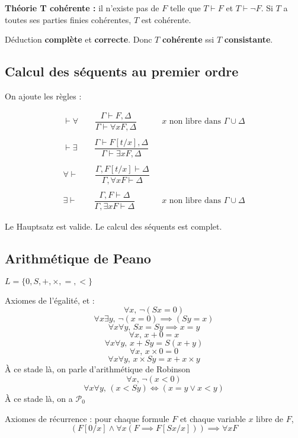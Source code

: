 \documentclass[french]{article}
\begin{document}
\textbf{Théorie T cohérente : }il n'existe pas de $F$ telle que $T\vdash F$ et $T\vdash\neg F$. Si $T$ a toutes ses parties finies cohérentes, $T$ est cohérente.

Déduction \textbf{complète} et \textbf{correcte}. Donc $T$ \textbf{cohérente} ssi $T$ \textbf{consistante}.

\subsection{Calcul des séquents au premier ordre}
On ajoute les règles :

\begin{align*}
\vdash\forall\qquad\dfrac{\Gamma\vdash F,\Delta}{\Gamma\vdash\forall x F,\Delta}&\text{ $x$ non libre dans $\Gamma\cup\Delta$}\\
\\
\vdash\exists\qquad\dfrac{\Gamma\vdash F[t/x],\Delta}{\Gamma\vdash\exists x F,\Delta}\\
\\
\forall\vdash\qquad\dfrac{\Gamma, F[t/x]\vdash\Delta}{\Gamma, \forall x F\vdash\Delta}\\
\\
\exists\vdash\qquad\dfrac{\Gamma, F\vdash\Delta}{\Gamma, \exists x F\vdash\Delta}&\text{ $x$ non libre dans  $\Gamma\cup\Delta$}
\end{align*}

Le Hauptsatz est valide. Le calcul des séquents est complet.

\subsection{Arithmétique de Peano}
$L = \{0,S,+,\times,=,<\}$

Axiomes de l'égalité, et :
$$\forall x,\, \neg(S x = 0)$$
$$\forall x\exists y,\, \neg(x=0)\implies(S y = x)$$
$$\forall x\forall y,\, S x = S y \implies x = y$$
$$\forall x,\, x+0=x$$
$$\forall x\forall y,\, x+S y = S(x + y)$$
$$\forall x,\, x\times 0 = 0$$
$$\forall x\forall y,\, x\times S y = x + x\times y$$
À ce stade là, on parle d'arithmétique de Robinson
$$\forall x,\, \neg(x<0)$$
$$\forall x\forall y,\, (x<S y)\Leftrightarrow(x = y \vee x<y)$$
À ce stade là, on a $\mathcal{P}_0$

Axiomes de récurrence : pour chaque formule $F$ et chaque variable $x$ libre de $F$, 
$$(F[0/x]\wedge\forall x (F\implies F[S x/x]))\implies\forall x F$$
\end{document}
